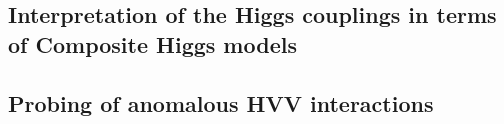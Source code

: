 \documentclass[../report.tex]{subfiles}
\providecommand{\main}{..}
\begin{document}
\subsection{Interpretation of the Higgs couplings in terms of Composite Higgs models}


\subsection{Probing of anomalous HVV interactions}
\label{sec2:anomalous_HVV}



\clearpage

\end{document}
